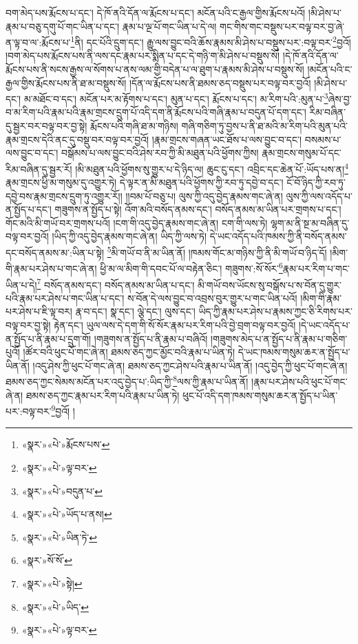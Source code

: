 བག་མེད་པས་རྨོངས་པ་དང་། དེ་ཁོ་ནའི་དོན་ལ་རྨོངས་པ་དང་། མངོན་པའི་ང་རྒྱལ་གྱིས་རྨོངས་པའོ། །མི་ཤེས་པ་རྣམ་པ་བཅུ་དགུ་པོ་གང་ཡིན་པ་དང་། རྣམ་པ་ལྔ་པོ་གང་ཡིན་པ་དེ་ལ། གང་གིས་གང་བསྡུས་པར་བལྟ་བར་བྱ་ཞེ་ན་ལྟ་བ་ལ་:རྨོངས་པ་\footnote{«སྣར་»«པེ་»རྨོངས་པས་}ནི། དང་པོའི་དྲུག་དང་། རྒྱུ་ལས་བྱུང་བའི་ཆོས་རྣམས་མི་ཤེས་པ་བསྡུས་པར་:བལྟ་བར་\footnote{«སྣར་»«པེ་»ལྟ་བར་}བྱའོ། །བག་མེད་པས་རྨོངས་པས་ནི་ལས་དང་རྣམ་པར་སྨིན་པ་དང་དེ་གཉི་ག་མི་ཤེས་པ་བསྡུས་སོ། །དེ་ཁོ་ནའི་དོན་ལ་རྨོངས་པས་ནི་སངས་རྒྱས་ལ་སོགས་པ་ནས་ལམ་གྱི་བདེན་པ་ལ་ཐུག་པ་རྣམས་མི་ཤེས་པ་བསྡུས་སོ། །མངོན་པའི་ང་རྒྱལ་གྱིས་རྨོངས་པས་ནི་ཐ་མ་བསྡུས་སོ། །དོན་ལ་རྨོངས་པས་ནི་ཐམས་ཅད་བསྡུས་པར་བལྟ་བར་བྱའོ། །མི་ཤེས་པ་དང་། མ་མཐོང་བ་དང་། མངོན་པར་མ་རྟོགས་པ་དང་། མུན་པ་དང་། རྨོངས་པ་དང་། མ་རིག་པའི་:མུན་པ་\footnote{«སྣར་»«པེ་»བདུན་པ་}ཞེས་བྱ་བ་མ་རིག་པའི་རྣམ་པའི་རྣམ་གྲངས་དྲུག་པོ་འདི་དག་ནི་རྨོངས་པའི་གཞི་རྣམ་པ་བདུན་པོ་དག་དང་། རིམ་བཞིན་དུ་སྦྱར་བར་བལྟ་བར་བྱ་སྟེ། རྨོངས་པའི་གཞི་ཐ་མ་གཉིས། གཞི་གཅིག་ཏུ་བྱས་པ་ནི་ཐ་མའི་མ་རིག་པའི་མུན་པའི་རྣམ་གྲངས་དེའི་ནང་དུ་བསྡུ་བར་བལྟ་བར་བྱའོ། །རྣམ་གྲངས་གཞན་ཡང་ཐོས་པ་ལས་བྱུང་བ་དང་། བསམས་པ་ལས་བྱུང་བ་དང་། བསྒོམས་པ་ལས་བྱུང་བའི་ཤེས་རབ་ཀྱི་མི་མཐུན་པའི་ཕྱོགས་ཀྱིས། རྣམ་གྲངས་གསུམ་པོ་དང་རིམ་བཞིན་དུ་སྦྱར་རོ། །མི་མཐུན་པའི་ཕྱོགས་སུ་གྱུར་པ་དེ་ཉིད་ལ། ཆུང་ངུ་དང་། འབྲིང་དང་ཆེན་པོ་:ཡོད་པས་ན།\footnote{«སྣར་»«པེ་»ཡོད་པ་ནས།} རྣམ་གྲངས་ཕྱི་མ་གསུམ་དུ་འགྱུར་ཏེ། དེ་ལྟར་ན་མི་མཐུན་པའི་ཕྱོགས་ཀྱི་རབ་ཏུ་དབྱེ་བ་དང་། ངོ་བོ་ཉིད་ཀྱི་རབ་ཏུ་དབྱེ་བས་རྣམ་གྲངས་དྲུག་ཏུ་འགྱུར་རོ།། །།བམ་པོ་བཅུ་པ། ལུས་ཀྱི་འདུ་བྱེད་རྣམས་གང་ཞེ་ན། ལུས་ཀྱི་ལས་འདོད་པ་ན་སྤྱོད་པ་དང་། གཟུགས་ན་སྤྱོད་པ་སྟེ། འོག་མའི་བསོད་ནམས་དང་། བསོད་ནམས་མ་ཡིན་པར་གྲགས་པ་དང་། གོང་མའི་མི་གཡོ་བར་གྲགས་པའོ། །ངག་གི་འདུ་བྱེད་རྣམས་གང་ཞེ་ན། ངག་གི་ལས་ཏེ། ལྷག་མ་ནི་སྔ་མ་བཞིན་དུ་བལྟ་བར་བྱའོ། །ཡིད་ཀྱི་འདུ་བྱེད་རྣམས་གང་ཞེ་ན། ཡིད་ཀྱི་ལས་ཏེ། དེ་ཡང་འདོད་པའི་ཁམས་ཀྱི་ནི་བསོད་ནམས་དང་བསོད་ནམས་མ་:ཡིན་པ་སྟེ། \footnote{«སྣར་»«པེ་»ཡིན་ཏེ་}མི་གཡོ་བ་ནི་མ་ཡིན་ནོ། །ཁམས་གོང་མ་གཉིས་ཀྱི་ནི་མི་གཡོ་བ་ཉིད་དོ། །མིག་གི་རྣམ་པར་ཤེས་པ་གང་ཞེ་ན། ཕྱི་མ་ལ་མིག་གི་དབང་པོ་ལ་བརྟེན་ཅིང་། གཟུགས་:སོ་སོར་\footnote{«སྣར་»སོ་སོ་}རྣམ་པར་རིག་པ་གང་ཡིན་པ་དེ།\footnote{«སྣར་»«པེ་»སྟེ།} བསོད་ནམས་དང་། བསོད་ནམས་མ་ཡིན་པ་དང་། མི་གཡོ་བས་ཡོངས་སུ་བསྒོས་པ་ས་བོན་དུ་གྱུར་པའི་རྣམ་པར་ཤེས་པ་གང་ཡིན་པ་དང་། ས་བོན་དེ་ལས་བྱུང་བ་འབྲས་བུར་གྱུར་པ་གང་ཡིན་པའོ། །མིག་གི་རྣམ་པར་ཤེས་པ་ཇི་ལྟ་བར། རྣ་བ་དང་། སྣ་དང་། ལྕེ་དང་། ལུས་དང་། ཡིད་ཀྱི་རྣམ་པར་ཤེས་པ་རྣམས་ཀྱང་ཅི་རིགས་པར་བལྟ་བར་བྱ་སྟེ། རྟེན་དང་། ཡུལ་ལས་དེ་དག་གི་སོ་སོར་རྣམ་པར་རིག་པའི་བྱེ་བྲག་བལྟ་བར་བྱའོ། །དེ་ཡང་འདོད་པ་ན་སྤྱོད་པ་ནི་རྣམ་པ་དྲུག་གོ། །གཟུགས་ན་སྤྱོད་པ་ནི་རྣམ་པ་བཞིའོ། །གཟུགས་མེད་པ་ན་སྤྱོད་པ་ནི་རྣམ་པ་གཅིག་པུའོ། །ཚོར་བའི་ཕུང་པོ་གང་ཞེ་ན། ཐམས་ཅད་ཀྱང་མྱོང་བའི་རྣམ་པ་ཡིན་ཏེ། དེ་ཡང་ཁམས་གསུམ་ཆར་ན་སྤྱོད་པ་ཡིན་ནོ། །འདུ་ཤེས་ཀྱི་ཕུང་པོ་གང་ཞེ་ན། ཐམས་ཅད་ཀྱང་ཤེས་པའི་རྣམ་པ་ཡིན་ནོ། །འདུ་བྱེད་ཀྱི་ཕུང་པོ་གང་ཞེ་ན། ཐམས་ཅད་ཀྱང་སེམས་མངོན་པར་འདུ་བྱེད་པ་:ཡིད་ཀྱི་\footnote{«སྣར་»«པེ་»ཡིད་}ལས་ཀྱི་རྣམ་པ་ཡིན་ནོ། །རྣམ་པར་ཤེས་པའི་ཕུང་པོ་གང་ཞེ་ན། ཐམས་ཅད་ཀྱང་རྣམ་པར་རིག་པའི་རྣམ་པ་ཡིན་ཏེ། ཕུང་པོ་འདི་དག་ཁམས་གསུམ་ཆར་ན་སྤྱོད་པ་ཡིན་པར་:བལྟ་བར་\footnote{«སྣར་»«པེ་»ལྟ་བར་}བྱའོ། །
